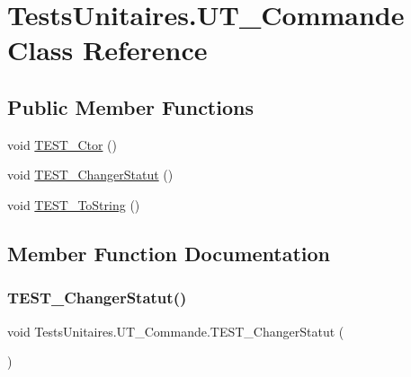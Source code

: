 \hypertarget{classTestsUnitaires_1_1UT__Commande}{}\section{Tests\+Unitaires.\+U\+T\+\_\+\+Commande Class Reference}
\label{classTestsUnitaires_1_1UT__Commande}
\subsection*{Public Member Functions}
\begin{DoxyCompactItemize}
\item 
void \hyperlink{classTestsUnitaires_1_1UT__Commande_a67dbb2a4887f937d4aa437d6c16ae02f}{T\+E\+S\+T\+\_\+\+Ctor} ()
\item 
void \hyperlink{classTestsUnitaires_1_1UT__Commande_a45b9452b1dd922773da94c52f4ab508d}{T\+E\+S\+T\+\_\+\+Changer\+Statut} ()
\item 
void \hyperlink{classTestsUnitaires_1_1UT__Commande_a9d303e2234739a0598ab936dac1ab7be}{T\+E\+S\+T\+\_\+\+To\+String} ()
\end{DoxyCompactItemize}


\subsection{Member Function Documentation}
\mbox{\label{classTestsUnitaires_1_1UT__Commande_a45b9452b1dd922773da94c52f4ab508d}} 
\subsubsection{\texorpdfstring{T\+E\+S\+T\+\_\+\+Changer\+Statut()}{TEST\_ChangerStatut()}}
{\footnotesize\ttfamily void Tests\+Unitaires.\+U\+T\+\_\+\+Commande.\+T\+E\+S\+T\+\_\+\+Changer\+Statut (\begin{DoxyParamCaption}{ }\end{DoxyParamCaption})\hspace{0.3cm}{\ttfamily [inline]}}



